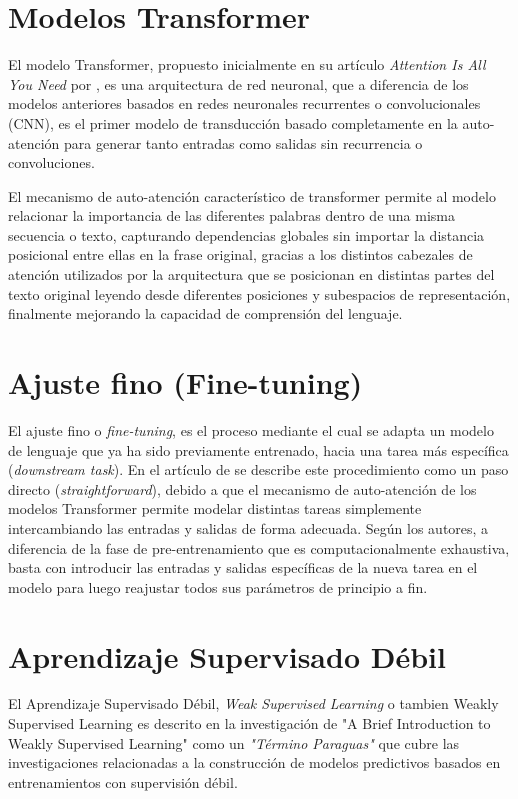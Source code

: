 \section{Modelos Transformer}
\label{sec:transformer}
El modelo Transformer, propuesto inicialmente en su artículo \textit{Attention Is All You Need} por \parencite{vaswani2017attention}, es una arquitectura de red neuronal, que a diferencia de los modelos anteriores basados en redes neuronales recurrentes o convolucionales (CNN), es el primer modelo de transducción basado completamente en la auto-atención para generar tanto entradas como salidas sin recurrencia o convoluciones.

El mecanismo de auto-atención característico de transformer permite al modelo relacionar la importancia de las diferentes palabras dentro de una misma secuencia o texto, capturando dependencias globales sin importar la distancia posicional entre ellas en la frase original, gracias a los distintos cabezales de atención utilizados por la arquitectura que se posicionan en distintas partes del texto original leyendo desde diferentes posiciones y subespacios de representación, finalmente mejorando la capacidad de comprensión del lenguaje.

\section{Ajuste fino (Fine-tuning)}
\label{sec:finetunning}
El ajuste fino o \textit{fine-tuning}, es el proceso mediante el cual se adapta un modelo de lenguaje que ya ha sido previamente entrenado, hacia una tarea más específica (\textit{downstream task}). En el artículo de \parencite{devlin2018bert} se describe este procedimiento como un paso directo (\textit{straightforward}), debido a que el mecanismo de auto-atención de los modelos Transformer permite modelar distintas tareas simplemente intercambiando las entradas y salidas de forma adecuada.
Según los autores, a diferencia de la fase de pre-entrenamiento que es computacionalmente exhaustiva, basta con introducir las entradas y salidas específicas de la nueva tarea en el modelo para luego reajustar todos sus parámetros de principio a fin\parencite{devlin2018bert}.

\section{Aprendizaje Supervisado Débil}
\label{sec:weak_supervised_learning}
El Aprendizaje Supervisado Débil, \textit{Weak Supervised Learning} o tambien Weakly Supervised Learning es descrito en la investigación de "A Brief Introduction to Weakly Supervised Learning" \cite{WeaklySupervisedLearning2017} como un \textit{"Término Paraguas"} que cubre las investigaciones relacionadas a la construcción de modelos predictivos basados en entrenamientos con supervisión débil.

